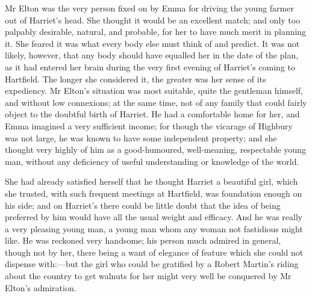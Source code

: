 Mr Elton was the very person fixed on by Emma for driving the young farmer out of Harriet's head. She thought it would be an excellent match; and only too palpably desirable, natural, and probable, for her to have much merit in planning it. She feared it was what every body else must think of and predict. It was not likely, however, that any body should have equalled her in the date of the plan, as it had entered her brain during the very first evening of Harriet's coming to Hartfield. The longer she considered it, the greater was her sense of its expediency. Mr Elton's situation was most suitable, quite the gentleman himself, and without low connexions; at the same time, not of any family that could fairly object to the doubtful birth of Harriet. He had a comfortable home for her, and Emma imagined a very sufficient income; for though the vicarage of Highbury was not large, he was known to have some independent property; and she thought very highly of him as a good-humoured, well-meaning, respectable young man, without any deficiency of useful understanding or knowledge of the world.

She had already satisfied herself that he thought Harriet a beautiful girl, which she trusted, with such frequent meetings at Hartfield, was foundation enough on his side; and on Harriet's there could be little doubt that the idea of being preferred by him would have all the usual weight and efficacy. And he was really a very pleasing young man, a young man whom any woman not fastidious might like. He was reckoned very handsome; his person much admired in general, though not by her, there being a want of elegance of feature which she could not dispense with:—but the girl who could be gratified by a Robert Martin's riding about the country to get walnuts for her might very well be conquered by Mr Elton's admiration.